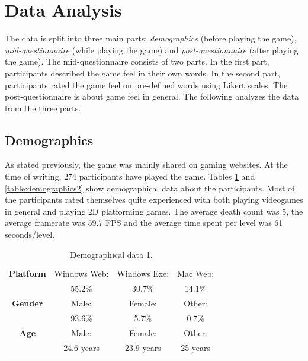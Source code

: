 \section{Data Analysis} \label{data}
The data is split into three main parts: \textit{demographics} (before playing the game), \textit{mid-questionnaire} (while playing the game) and \textit{post-questionnaire} (after playing the game). The mid-questionnaire consists of two parts. In the first part, participants described the game feel in their own words. In the second part, participants rated the game feel on pre-defined words using Likert scales. The post-questionnaire is about game feel in general. The following analyzes the data from the three parts.

\subsection{Demographics}
As stated previously, the game was mainly shared on gaming websites. At the time of writing, 274 participants have played the game. Tables \ref{table:demographics1} and \ref{table:demographics2} show demographical data about the participants. Most of the participants rated themselves quite experienced with both playing videogames in general and playing 2D platforming games. The average death count was 5, the average framerate was 59.7 FPS and the average time spent per level was 61 seconds/level.

\begin{table} \centering
\small
\caption{Demographical data 1.}
\label{table:demographics1}
\renewcommand{\arraystretch}{1.2}
\begin{tabular}{cccc}
\toprule
\textbf{Platform} & Windows Web: & Windows Exe: & Mac Web: \\
                  & 55.2\%      & 30.7\%      & 14.1\%  \\
\textbf{Gender}   & Male:        & Female:      & Other:   \\
                  & 93.6\%      & 5.7\%       & 0.7\%   \\
\textbf{Age}      & Male:     & Female:            & Other:        \\
                  & 24.6 years  & 23.9 years           & 25 years        \\
\bottomrule
\end{tabular}
\end{table}

